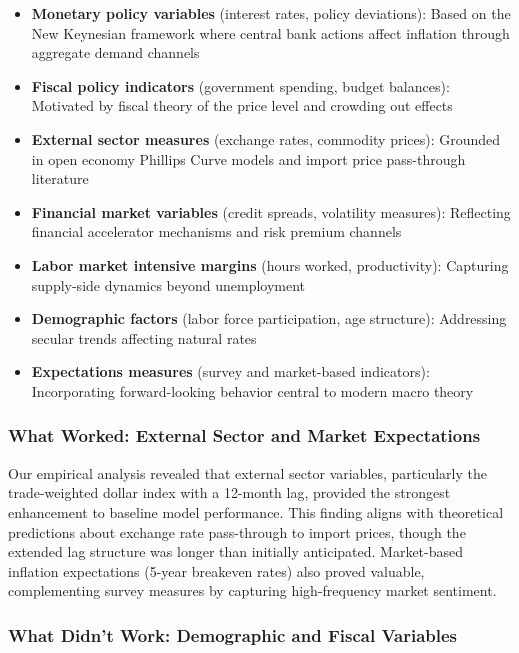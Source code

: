\documentclass[12pt]{article}
\begin{document}
\begin{itemize}
\item \textbf{Monetary policy variables} (interest rates, policy deviations): Based on the New Keynesian framework where central bank actions affect inflation through aggregate demand channels
\item \textbf{Fiscal policy indicators} (government spending, budget balances): Motivated by fiscal theory of the price level and crowding out effects
\item \textbf{External sector measures} (exchange rates, commodity prices): Grounded in open economy Phillips Curve models and import price pass-through literature
\item \textbf{Financial market variables} (credit spreads, volatility measures): Reflecting financial accelerator mechanisms and risk premium channels
\item \textbf{Labor market intensive margins} (hours worked, productivity): Capturing supply-side dynamics beyond unemployment
\item \textbf{Demographic factors} (labor force participation, age structure): Addressing secular trends affecting natural rates
\item \textbf{Expectations measures} (survey and market-based indicators): Incorporating forward-looking behavior central to modern macro theory
\end{itemize}

\subsubsection{What Worked: External Sector and Market Expectations}

Our empirical analysis revealed that external sector variables, particularly the trade-weighted dollar index with a 12-month lag, provided the strongest enhancement to baseline model performance. This finding aligns with theoretical predictions about exchange rate pass-through to import prices, though the extended lag structure was longer than initially anticipated. Market-based inflation expectations (5-year breakeven rates) also proved valuable, complementing survey measures by capturing high-frequency market sentiment.

\subsubsection{What Didn't Work: Demographic and Fiscal Variables}  
\end{document}
